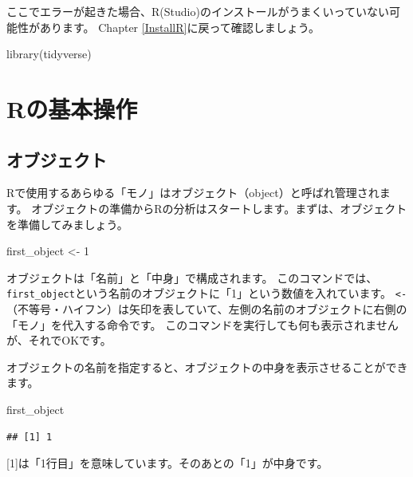 \documentclass[
]{book}
\newenvironment{Shaded}{\begin{snugshade}}{\end{snugshade}}
\newcommand{\DecValTok}[1]{\textcolor[rgb]{0.00,0.00,0.81}{#1}}
\newcommand{\FunctionTok}[1]{\textcolor[rgb]{0.00,0.00,0.00}{#1}}
\newcommand{\NormalTok}[1]{#1}
\newcommand{\OtherTok}[1]{\textcolor[rgb]{0.56,0.35,0.01}{#1}}
\begin{document}
ここでエラーが起きた場合、R(Studio)のインストールがうまくいっていない可能性があります。
Chapter \ref{InstallR}に戻って確認しましょう。

\begin{Shaded}
\begin{Highlighting}[]
\FunctionTok{library}\NormalTok{(tidyverse)}
\end{Highlighting}
\end{Shaded}

\hypertarget{Rbasics}{%
\chapter{Rの基本操作}\label{Rbasics}}

\hypertarget{ux30aaux30d6ux30b8ux30a7ux30afux30c8}{%
\section{オブジェクト}\label{ux30aaux30d6ux30b8ux30a7ux30afux30c8}}

Rで使用するあらゆる「モノ」はオブジェクト（object）と呼ばれ管理されます。
オブジェクトの準備からRの分析はスタートします。まずは、オブジェクトを準備してみましょう。

\begin{Shaded}
\begin{Highlighting}[]
\NormalTok{first\_object }\OtherTok{\textless{}{-}} \DecValTok{1} 
\end{Highlighting}
\end{Shaded}

オブジェクトは「名前」と「中身」で構成されます。
このコマンドでは、\texttt{first\_object}という名前のオブジェクトに「1」という数値を入れています。
\texttt{\textless{}-}（不等号・ハイフン）は矢印を表していて、左側の名前のオブジェクトに右側の「モノ」を代入する命令です。
このコマンドを実行しても何も表示されませんが、それでOKです。

オブジェクトの名前を指定すると、オブジェクトの中身を表示させることができます。

\begin{Shaded}
\begin{Highlighting}[]
\NormalTok{first\_object}
\end{Highlighting}
\end{Shaded}

\begin{verbatim}
## [1] 1
\end{verbatim}

{[}1{]}は「1行目」を意味しています。そのあとの「1」が中身です。
\end{document}
